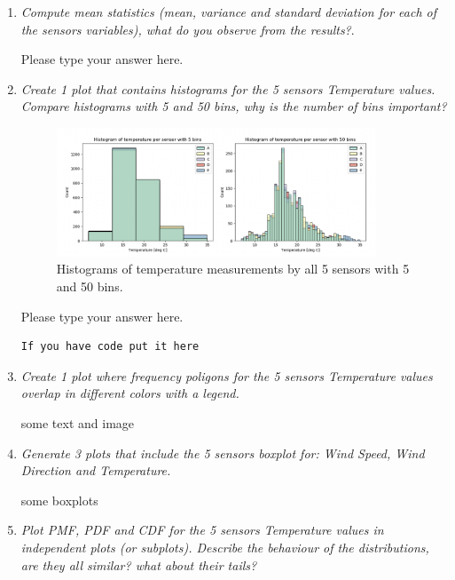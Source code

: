 \documentclass[a4paper,12pt]{article} %
\begin{document}
\begin{enumerate}

\item {\it Compute mean statistics (mean, variance and standard deviation for each of the sensors variables), what do you observe from the results?}. %

Please type your answer here.

\item {\it Create 1 plot that contains histograms for the 5 sensors Temperature values. Compare histograms with 5 and 50 bins, why is the number of bins important?}

 \begin{figure}[H] 
    \centering
    \includegraphics[width=0.9\textwidth]{HIstograms 50 and 5 bins.png} 
    \caption{Histograms of temperature measurements by all 5 sensors with 5 and 50 bins.} %
    \label{fig:hist5and50}
  \end{figure}

Please type your answer here.

\begin{verbatim}
If you have code put it here
\end{verbatim}

\item {\it Create 1 plot where frequency poligons for the 5 sensors Temperature values overlap in different colors with a legend.}

some text and image 

\item {\it Generate 3 plots that include the 5 sensors boxplot for: Wind Speed, Wind Direction and Temperature.}

some boxplots 

\item {\it Plot PMF, PDF and CDF for the 5 sensors Temperature values in independent plots (or subplots). Describe the behaviour of the distributions, are they all similar? what about their tails?}


\end{enumerate}
\end{document}
